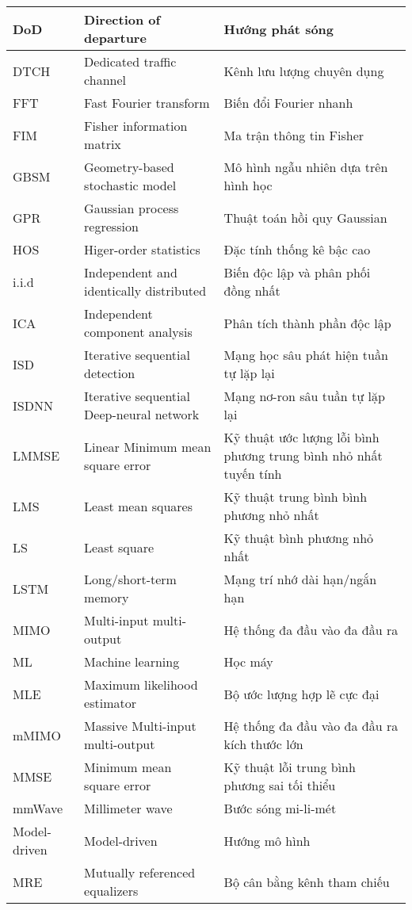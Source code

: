 {{\begin{longtable}{|p{2.35cm}|>{\raggedright}p{6.2cm}|p{5.75cm}|}
\hline
DoD & Direction of departure & Hướng phát sóng \\ 
\hline
DTCH & Dedicated traffic channel & Kênh lưu lượng chuyên dụng \\ 
\hline
FFT & Fast Fourier transform & Biến đổi Fourier nhanh \\ 
\hline
FIM & Fisher information matrix & Ma trận thông tin Fisher \\ 
\hline
GBSM & Geometry-based stochastic model & Mô hình ngẫu nhiên dựa trên hình học\\
\hline
GPR & Gaussian process regression & Thuật toán hồi quy Gaussian \\ 
\hline
HOS & Higer-order statistics & Đặc tính thống kê bậc cao \\ 
\hline
i.i.d & Independent and identically distributed & Biến độc lập và phân phối đồng nhất \\ 
\hline
ICA & Independent component analysis & Phân tích thành phần độc lập \\ 
\hline
ISD & Iterative sequential detection & Mạng học sâu phát hiện tuần tự lặp lại \\ 
\hline
ISDNN & Iterative sequential Deep-neural network & Mạng nơ-ron sâu tuần tự lặp lại \\ 
\hline
LMMSE & Linear Minimum mean square error & Kỹ thuật ước lượng lỗi bình phương trung bình nhỏ nhất tuyến tính \\ 
\hline
LMS & Least mean squares & Kỹ thuật trung bình bình phương nhỏ nhất \\ 
\hline
LS & Least square & Kỹ thuật bình phương nhỏ nhất \\ 
\hline
LSTM & Long/short-term memory & Mạng trí nhớ dài hạn/ngắn hạn \\ 
\hline
MIMO & Multi-input multi-output & Hệ thống đa đầu vào đa đầu ra \\ 
\hline
ML & Machine learning & Học máy \\ 
\hline
MLE & Maximum likelihood estimator & Bộ ước lượng hợp lẽ cực đại \\ 
\hline
mMIMO & Massive Multi-input multi-output & Hệ thống đa đầu vào đa đầu ra kích thước lớn \\ 
\hline
MMSE & Minimum mean square error & Kỹ thuật lỗi trung bình phương sai tối thiểu \\ 
\hline
mmWave & Millimeter wave & Bước sóng mi-li-mét \\ 
\hline
Model-driven & Model-driven & Hướng mô hình \\ 
\hline
MRE & Mutually referenced equalizers & Bộ cân bằng kênh tham chiếu \\ 

\end{longtable}}}
